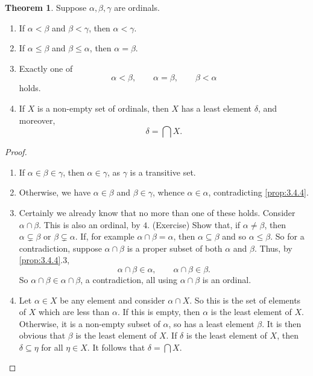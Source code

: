 \documentclass{article}
\theoremstyle{definition}\newtheorem{definition}{Definition}[subsection]
\theoremstyle{definition}\newtheorem{remark1}[definition]{Remark}
\theoremstyle{definition}\newtheorem{example1}[definition]{Example}
\theoremstyle{definition}\newtheorem*{remark2}{Remark}
\theoremstyle{definition}\newtheorem*{example2}{Example}
\theoremstyle{definition}\newtheorem*{note}{Note}
\theoremstyle{definition}\newtheorem*{notation}{Notation}
\newtheorem{theorem}[definition]{Theorem}
\begin{document}
\begin{theorem}
\label{thm:3.4.6}
Suppose $ \alpha, \beta, \gamma $ are ordinals.
\begin{enumerate}
\item If $ \alpha < \beta $ and $ \beta < \gamma $, then $ \alpha < \gamma $.
\item If $ \alpha \le \beta $ and $ \beta \le \alpha $, then $ \alpha = \beta $.
\item Exactly one of
$$ \alpha < \beta, \qquad \alpha = \beta, \qquad \beta < \alpha $$
holds.
\item If $ X $ is a non-empty set of ordinals, then $ X $ has a least element $ \delta $, and moreover,
$$ \delta = \bigcap X. $$
\end{enumerate}
\end{theorem}

\begin{proof}
\hfill
\begin{enumerate}
\item If $ \alpha \in \beta \in \gamma $, then $ \alpha \in \gamma $, as $ \gamma $ is a transitive set.
\item Otherwise, we have $ \alpha \in \beta $ and $ \beta \in \gamma $, whence $ \alpha \in \alpha $, contradicting \ref{prop:3.4.4}.
\item Certainly we already know that no more than one of these holds. Consider $ \alpha \cap \beta $. This is also an ordinal, by $ 4 $. (Exercise) Show that, if $ \alpha \ne \beta $, then $ \alpha \subsetneq \beta $ or $ \beta \subsetneq \alpha $. If, for example $ \alpha \cap \beta = \alpha $, then $ \alpha \subseteq \beta $ and so $ \alpha \le \beta $. So for a contradiction, suppose $ \alpha \cap \beta $ is a proper subset of both $ \alpha $ and $ \beta $. Thus, by \ref{prop:3.4.4}.$ 3 $,
$$ \alpha \cap \beta \in \alpha, \qquad \alpha \cap \beta \in \beta. $$
So $ \alpha \cap \beta \in \alpha \cap \beta $, a contradiction, all using $ \alpha \cap \beta $ is an ordinal.
\item Let $ \alpha \in X $ be any element and consider $ \alpha \cap X $. So this is the set of elements of $ X $ which are less than $ \alpha $. If this is empty, then $ \alpha $ is the least element of $ X $. Otherwise, it is a non-empty subset of $ \alpha $, so has a least element $ \beta $. It is then obvious that $ \beta $ is the least element of $ X $. If $ \delta $ is the least element of $ X $, then $ \delta \subseteq \eta $ for all $ \eta \in X $. It follows that $ \delta = \bigcap X $.
\end{enumerate}
\end{proof}
\end{document}

